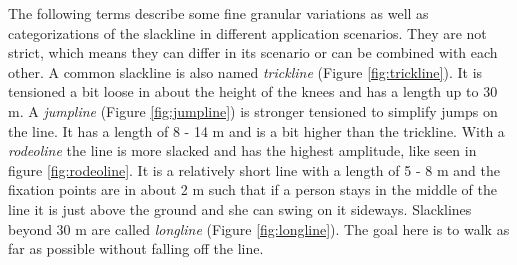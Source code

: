 The following terms describe some fine granular variations as well as categorizations of the slackline in different application scenarios. They are not strict, which means they can differ in its scenario or can be combined with each other. A common slackline is also named \textit{trickline} (Figure \ref{fig:trickline}). It is tensioned a bit loose in about the height of the knees and has a length up to 30 m. A \textit{jumpline} (Figure \ref{fig:jumpline}) is stronger tensioned to simplify jumps on the line. It has a length of 8 - 14 m and is a bit higher than the trickline. With a \textit{rodeoline} the line is more slacked and has the highest amplitude, like seen in figure \ref{fig:rodeoline}. It is a relatively short line with a length of 5 - 8 m and the fixation points are in about 2 m such that if a person stays in the middle of the line it is just above the ground and she can swing on it sideways. Slacklines beyond 30 m are called \textit{longline} (Figure \ref{fig:longline}). The goal here is to walk as far as possible without falling off the line.

